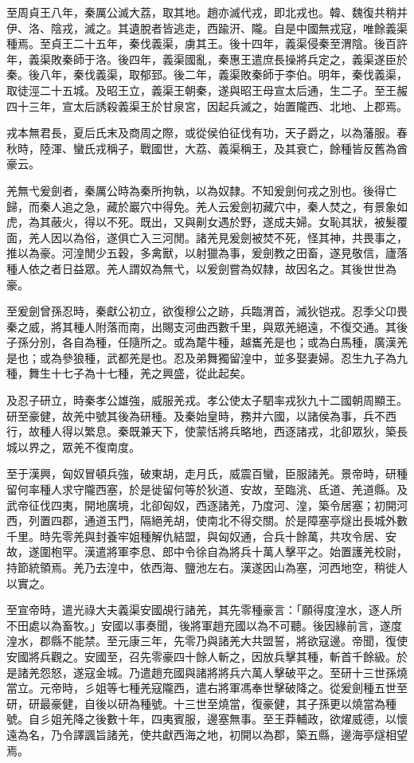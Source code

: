 \begin{pinyinscope}
至周貞王八年，秦厲公滅大荔，取其地。趙亦滅代戎，即北戎也。韓、魏復共稍并伊、洛、陰戎，滅之。其遺脫者皆逃走，西踰汧、隴。自是中國無戎寇，唯餘義渠種焉。至貞王二十五年，秦伐義渠，虜其王。後十四年，義渠侵秦至渭陰。後百許年，義渠敗秦師于洛。後四年，義渠國亂，秦惠王遣庶長操將兵定之，義渠遂臣於秦。後八年，秦伐義渠，取郁郅。後二年，義渠敗秦師于李伯。明年，秦伐義渠，取徒涇二十五城。及昭王立，義渠王朝秦，遂與昭王母宣太后通，生二子。至王赧四十三年，宣太后誘殺義渠王於甘泉宮，因起兵滅之，始置隴西、北地、上郡焉。

戎本無君長，夏后氏末及商周之際，或從侯伯征伐有功，天子爵之，以為藩服。春秋時，陸渾、蠻氏戎稱子，戰國世，大荔、義渠稱王，及其衰亡，餘種皆反舊為酋豪云。

羌無弋爰劍者，秦厲公時為秦所拘執，以為奴隸。不知爰劍何戎之別也。後得亡歸，而秦人追之急，藏於巖穴中得免。羌人云爰劍初藏穴中，秦人焚之，有景象如虎，為其蔽火，得以不死。既出，又與劓女遇於野，遂成夫婦。女恥其狀，被髮覆面，羌人因以為俗，遂俱亡入三河閒。諸羌見爰劍被焚不死，怪其神，共畏事之，推以為豪。河湟閒少五穀，多禽獸，以射獵為事，爰劍教之田畜，遂見敬信，廬落種人依之者日益眾。羌人謂奴為無弋，以爰劍嘗為奴隸，故因名之。其後世世為豪。

至爰劍曾孫忍時，秦獻公初立，欲復穆公之跡，兵臨渭首，滅狄铠戎。忍季父卬畏秦之威，將其種人附落而南，出賜支河曲西數千里，與眾羌絕遠，不復交通。其後子孫分別，各自為種，任隨所之。或為氂牛種，越巂羌是也；或為白馬種，廣漢羌是也；或為參狼種，武都羌是也。忍及弟舞獨留湟中，並多娶妻婦。忍生九子為九種，舞生十七子為十七種，羌之興盛，從此起矣。

及忍子研立，時秦孝公雄強，威服羌戎。孝公使太子駟率戎狄九十二國朝周顯王。研至豪健，故羌中號其後為研種。及秦始皇時，務并六國，以諸侯為事，兵不西行，故種人得以繁息。秦既兼天下，使蒙恬將兵略地，西逐諸戎，北卻眾狄，築長城以界之，眾羌不復南度。

至于漢興，匈奴冒頓兵強，破東胡，走月氏，威震百蠻，臣服諸羌。景帝時，研種留何率種人求守隴西塞，於是徙留何等於狄道、安故，至臨洮、氐道、羌道縣。及武帝征伐四夷，開地廣境，北卻匈奴，西逐諸羌，乃度河、湟，築令居塞；初開河西，列置四郡，通道玉門，隔絕羌胡，使南北不得交關。於是障塞亭燧出長城外數千里。時先零羌與封養牢姐種解仇結盟，與匈奴通，合兵十餘萬，共攻令居、安故，遂圍枹罕。漢遣將軍李息、郎中令徐自為將兵十萬人擊平之。始置護羌校尉，持節統領焉。羌乃去湟中，依西海、鹽池左右。漢遂因山為塞，河西地空，稍徙人以實之。

至宣帝時，遣光祿大夫義渠安國覘行諸羌，其先零種豪言：「願得度湟水，逐人所不田處以為畜牧。」安國以事奏聞，後將軍趙充國以為不可聽。後因緣前言，遂度湟水，郡縣不能禁。至元康三年，先零乃與諸羌大共盟誓，將欲寇邊。帝聞，復使安國將兵觀之。安國至，召先零豪四十餘人斬之，因放兵擊其種，斬首千餘級。於是諸羌怨怒，遂寇金城。乃遣趙充國與諸將將兵六萬人擊破平之。至研十三世孫燒當立。元帝時，彡姐等七種羌寇隴西，遣右將軍馮奉世擊破降之。從爰劍種五世至研，研最豪健，自後以研為種號。十三世至燒當，復豪健，其子孫更以燒當為種號。自彡姐羌降之後數十年，四夷賓服，邊塞無事。至王莽輔政，欲燿威德，以懷遠為名，乃令譯諷旨諸羌，使共獻西海之地，初開以為郡，築五縣，邊海亭燧相望焉。


\end{pinyinscope}
